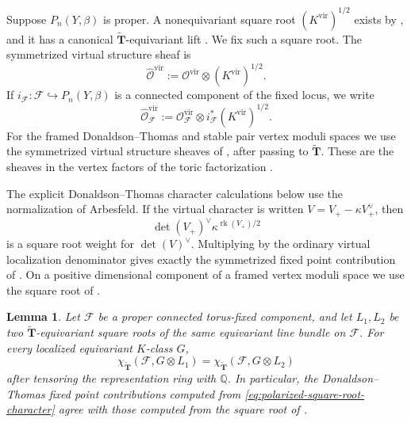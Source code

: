 \documentclass{amsart}
\newtheorem{lemma}{Lemma}
\theoremstyle{definition}
\numberwithin{equation}{section}
\newcommand{\Q}{\mathbb Q}
\newcommand{\cO}{\mathcal O}
\newcommand{\rk}{\operatorname{rk}}
\begin{document}
Suppose \(P_n(Y,\beta)\) is proper.  A nonequivariant square root \((K^{\mathrm{vir}})^{1/2}\) exists by \cite[Section~6.2, Proposition~6.4]{NekrasovOkounkov}, and it has a canonical \(\widetilde{\mathbf T}\)-equivariant lift \cite[Section~7.2]{NekrasovOkounkov}.  We fix such a square root.  The symmetrized virtual structure sheaf is
\begin{equation}
 \widehat{\cO}^{\mathrm{vir}}
 :=\cO^{\mathrm{vir}}\otimes(K^{\mathrm{vir}})^{1/2}.
\label{eq:PT-symmetrized-sheaf}
\end{equation}
If \(i_{\mathscr F}:\mathscr F\hookrightarrow P_n(Y,\beta)\) is a connected component of the fixed locus, we write
\begin{equation}
 \widehat{\cO}_{\mathscr F}^{\mathrm{vir}}
 :=\cO_{\mathscr F}^{\mathrm{vir}}
   \otimes i_{\mathscr F}^*(K^{\mathrm{vir}})^{1/2}.
\label{eq:fixed-locus-symmetrized-sheaf}
\end{equation}
For the framed Donaldson--Thomas and stable pair vertex moduli spaces we use the symmetrized virtual structure sheaves of \cite[Lemma~3.3.7]{KuhnLiuThimm}, after passing to \(\widetilde{\mathbf T}\).  These are the sheaves in the vertex factors of the toric factorization \cite[Section~1.2, equation~(3)]{KuhnLiuThimm}.

The explicit Donaldson--Thomas character calculations below use the normalization of Arbesfeld.  If the virtual character is written \(V=V_+-\kappa V_+^\vee\), then
\begin{equation}
 \det(V_+)^\vee\kappa^{\rk(V_+)/2}
\label{eq:polarized-square-root-character}
\end{equation}
is a square root weight for \(\det(V)^\vee\).  Multiplying by the ordinary virtual localization denominator gives exactly the symmetrized fixed point contribution of \cite[equation~(2.6)]{Arbesfeld}.  On a positive dimensional component of a framed vertex moduli space we use the square root of \cite[Lemma~3.3.7]{KuhnLiuThimm}.

\begin{lemma}
\label{lem:fixed-locus-square-root-independence}
Let \(\mathscr F\) be a proper connected torus-fixed component, and let \(L_1,L_2\) be two \(\widetilde{\mathbf T}\)-equivariant square roots of the same equivariant line bundle on \(\mathscr F\).  For every localized equivariant \(K\)-class \(G\),
\[
 \chi_{\widetilde{\mathbf T}}(\mathscr F,G\otimes L_1)
 =\chi_{\widetilde{\mathbf T}}(\mathscr F,G\otimes L_2)
\]
after tensoring the representation ring with \(\Q\).  In particular, the Donaldson--Thomas fixed point contributions computed from \eqref{eq:polarized-square-root-character} agree with those computed from the square root of \cite[Lemma~3.3.7]{KuhnLiuThimm}.
\end{lemma}
\end{document}
